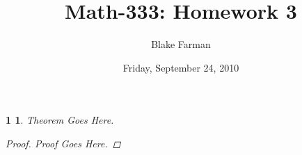 \documentclass[10pt]{amsart}
\author{Blake Farman}
\title{Math-333: Homework 3\\}
\date{Friday, September 24, 2010}\pdfpagewidth 8.5in
\begin{document}
\maketitle

\newtheorem*{1}{1}
\begin{1}
  Theorem Goes Here.
  \begin{proof}
    Proof Goes Here.
  \end{proof}
\end{1}
\end{document}
